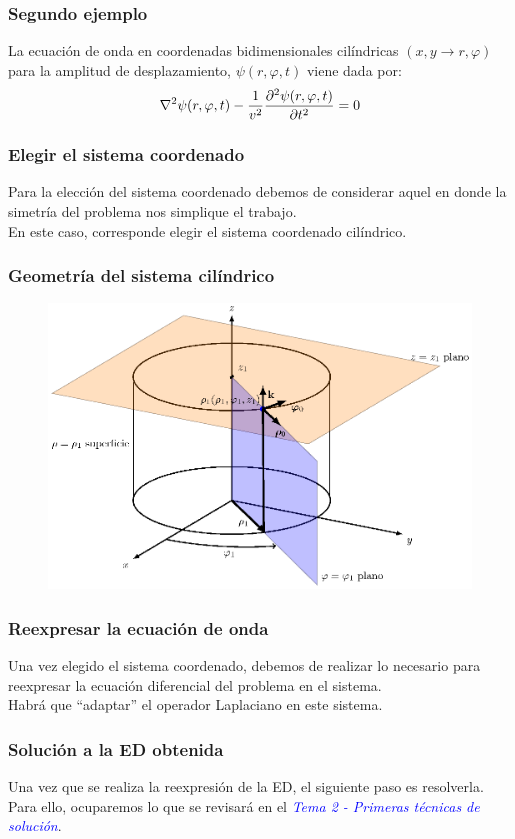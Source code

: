 \documentclass[12pt]{beamer}
\begin{document}
\begin{frame}
\frametitle{Segundo ejemplo}
La ecuación de onda en coordenadas bidimensionales cilíndricas $(x , y \rightarrow r, \varphi)$ para la amplitud de desplazamiento, $\psi (r, \varphi, t)$ viene dada por:
\pause
\begin{align*}
\laplacian \psi (r, \varphi, t) - \dfrac{1}{v^{2}} \pdv[2]{\psi (r, \varphi, t)}{t} = 0
\end{align*}
\end{frame}
\begin{frame}
\frametitle{Elegir el sistema coordenado}
Para la elección del sistema coordenado debemos de considerar aquel en donde la simetría del problema nos simplique el trabajo.
\\
\bigskip
\pause
En este caso, corresponde elegir el sistema coordenado cilíndrico.
\end{frame}
\begin{frame}
\frametitle{Geometría del sistema cilíndrico}
\begin{figure}[H]
  \centering
  \includegraphics[scale=0.7]{Imagenes/Coordenadas_Cilindricas_01.eps}
\end{figure}
\end{frame}
\begin{frame}
\frametitle{Reexpresar la ecuación de onda}
Una vez elegido el sistema coordenado, debemos de realizar lo necesario para reexpresar la ecuación diferencial del problema en el sistema.
\\
\bigskip
\pause
Habrá que \enquote{adaptar} el operador Laplaciano en este sistema.
\end{frame}
\begin{frame}
\frametitle{Solución a la ED obtenida}
Una vez que se realiza la reexpresión de la ED, el siguiente paso es resolverla.
\\
\bigskip
\pause
Para ello, ocuparemos lo que se revisará en el \emph{\textcolor{blue}{Tema 2 - Primeras técnicas de solución}}.
\end{frame}
\end{document}
